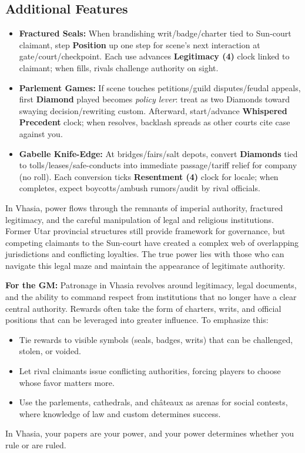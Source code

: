\subsection*{Additional Features}
\begin{itemize}
\item \textbf{Fractured Seals:} When brandishing writ/badge/charter tied to Sun-court claimant, step \textbf{Position} up one step for scene's next interaction at gate/court/checkpoint. Each use advances \textbf{Legitimacy (4)} clock linked to claimant; when fills, rivals challenge authority on sight.
\item \textbf{Parlement Games:} If scene touches petitions/guild disputes/feudal appeals, first \textbf{Diamond} played becomes \emph{policy lever}: treat as two Diamonds toward swaying decision/rewriting custom. Afterward, start/advance \textbf{Whispered Precedent} clock; when resolves, backlash spreads as other courts cite case against you.
\item \textbf{Gabelle Knife-Edge:} At bridges/fairs/salt depots, convert \textbf{Diamonds} tied to tolls/leases/safe-conducts into immediate passage/tariff relief for company (no roll). Each conversion ticks \textbf{Resentment (4)} clock for locale; when completes, expect boycotts/ambush rumors/audit by rival officials.
\end{itemize}

\begin{tcolorbox}[colback=black!3,colframe=black!40!white,title={Patronage \& Power}]
In Vhasia, power flows through the remnants of imperial authority, fractured legitimacy, and the careful manipulation of legal and religious institutions. Former Utar provincial structures still provide framework for governance, but competing claimants to the Sun-court have created a complex web of overlapping jurisdictions and conflicting loyalties. The true power lies with those who can navigate this legal maze and maintain the appearance of legitimate authority.

\textbf{For the GM:}  
Patronage in Vhasia revolves around legitimacy, legal documents, and the ability to command respect from institutions that no longer have a clear central authority. Rewards often take the form of charters, writs, and official positions that can be leveraged into greater influence. To emphasize this:
\begin{itemize}
\item Tie rewards to visible symbols (seals, badges, writs) that can be challenged, stolen, or voided.
\item Let rival claimants issue conflicting authorities, forcing players to choose whose favor matters more.
\item Use the parlements, cathedrals, and châteaux as arenas for social contests, where knowledge of law and custom determines success.
\end{itemize}
In Vhasia, your papers are your power, and your power determines whether you rule or are ruled.
\end{tcolorbox}

